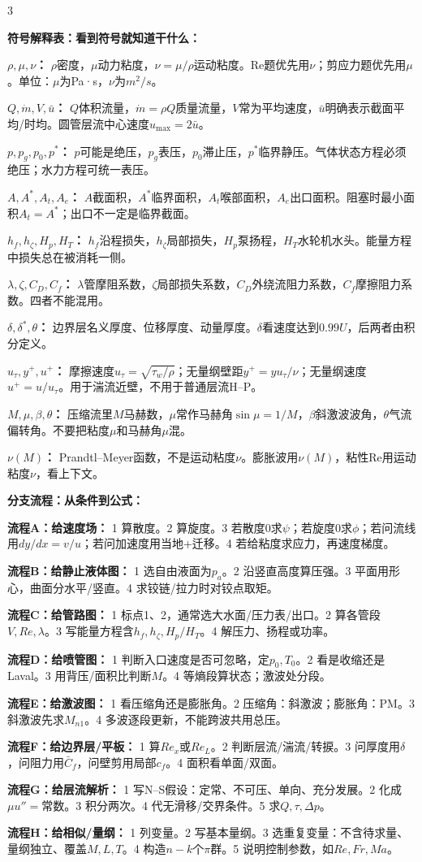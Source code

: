 \documentclass[a4paper]{article}
\newcommand{\sect}[1]{\par{\bfseries\color{Q}#1：}}
\begin{document}
\begin{multicols}{3}
{\sect{符号解释表：看到符号就知道干什么}
\sect{$\rho,\mu,\nu$}
$\rho$密度，$\mu$动力粘度，$\nu=\mu/\rho$运动粘度。Re题优先用$\nu$；剪应力题优先用$\mu$。单位：$\mu$为Pa·s，$\nu$为$m^2/s$。
\sect{$Q,\dot m,V,\bar u$}
$Q$体积流量，$\dot m=\rho Q$质量流量，$V$常为平均速度，$\bar u$明确表示截面平均/时均。圆管层流中心速度$u_{\max}=2\bar u$。
\sect{$p,p_g,p_0,p^*$}
$p$可能是绝压，$p_g$表压，$p_0$滞止压，$p^*$临界静压。气体状态方程必须绝压；水力方程可统一表压。
\sect{$A,A^*,A_t,A_e$}
$A$截面积，$A^*$临界面积，$A_t$喉部面积，$A_e$出口面积。阻塞时最小面积$A_t=A^*$；出口不一定是临界截面。
\sect{$h_f,h_\zeta,H_p,H_T$}
$h_f$沿程损失，$h_\zeta$局部损失，$H_p$泵扬程，$H_T$水轮机水头。能量方程中损失总在被消耗一侧。
\sect{$\lambda,\zeta,C_D,C_f$}
$\lambda$管摩阻系数，$\zeta$局部损失系数，$C_D$外绕流阻力系数，$C_f$摩擦阻力系数。四者不能混用。
\sect{$\delta,\delta^*,\theta$}
边界层名义厚度、位移厚度、动量厚度。$\delta$看速度达到$0.99U$，后两者由积分定义。
\sect{$u_\tau,y^+,u^+$}
摩擦速度$u_\tau=\sqrt{\tau_w/\rho}$；无量纲壁距$y^+=yu_\tau/\nu$；无量纲速度$u^+=u/u_\tau$。用于湍流近壁，不用于普通层流H--P。
\sect{$M,\mu,\beta,\theta$}
压缩流里$M$马赫数，$\mu$常作马赫角$\sin\mu=1/M$，$\beta$斜激波波角，$\theta$气流偏转角。不要把粘度$\mu$和马赫角$\mu$混。
\sect{$\nu(M)$}
Prandtl--Meyer函数，不是运动粘度$\nu$。膨胀波用$\nu(M)$，粘性Re用运动粘度$\nu$，看上下文。

\sect{分支流程：从条件到公式}
\sect{流程A：给速度场}
1 算散度。2 算旋度。3 若散度0求$\psi$；若旋度0求$\phi$；若问流线用$dy/dx=v/u$；若问加速度用当地+迁移。4 若给粘度求应力，再速度梯度。
\sect{流程B：给静止液体图}
1 选自由液面为$p_a$。2 沿竖直高度算压强。3 平面用形心，曲面分水平/竖直。4 求铰链/拉力时对铰点取矩。
\sect{流程C：给管路图}
1 标点1、2，通常选大水面/压力表/出口。2 算各管段$V,Re,\lambda$。3 写能量方程含$h_f,h_\zeta,H_p/H_T$。4 解压力、扬程或功率。
\sect{流程D：给喷管图}
1 判断入口速度是否可忽略，定$p_0,T_0$。2 看是收缩还是Laval。3 用背压/面积比判断$M$。4 等熵段算状态；激波处分段。
\sect{流程E：给激波图}
1 看压缩角还是膨胀角。2 压缩角：斜激波；膨胀角：PM。3 斜激波先求$M_{n1}$。4 多波逐段更新，不能跨波共用总压。
\sect{流程F：给边界层/平板}
1 算$Re_x$或$Re_L$。2 判断层流/湍流/转捩。3 问厚度用$\delta$，问阻力用$\bar C_f$，问壁剪用局部$c_f$。4 面积看单面/双面。
\sect{流程G：给层流解析}
1 写N--S假设：定常、不可压、单向、充分发展。2 化成$\mu u''=$常数。3 积分两次。4 代无滑移/交界条件。5 求$Q,\tau,\Delta p$。
\sect{流程H：给相似/量纲}
1 列变量。2 写基本量纲。3 选重复变量：不含待求量、量纲独立、覆盖$M,L,T$。4 构造$n-k$个$\pi$群。5 说明控制参数，如$Re,Fr,Ma$。

}
\end{multicols}
\end{document}
